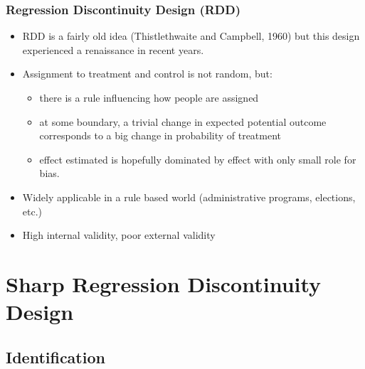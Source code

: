 \documentclass[xcolor=dvipsnames]{beamer}
\begin{document}
\begin{frame}
  \frametitle{Regression Discontinuity Design (RDD)}
  \begin{itemize}
    \item<1-> RDD is a fairly old idea (Thistlethwaite and Campbell, 1960) but this design experienced a renaissance in recent years. \bigskip
   \item<2-> Assignment to treatment and control is not random, but:
\begin{itemize}
\item<3-> there is a rule influencing how people are assigned
\item<4-> at some boundary, a trivial change in expected potential outcome corresponds to a big change in probability of treatment
\item<5-> effect estimated is hopefully dominated by effect with only small role for bias.
\end{itemize}
\bigskip
\item<6-> Widely applicable in a rule based world (administrative programs, elections, etc.)\bigskip
\item<7-> High internal validity, poor external validity
\end{itemize}
\end{frame}


\section{Sharp Regression Discontinuity Design}

\subsection{Identification}
\end{document}
